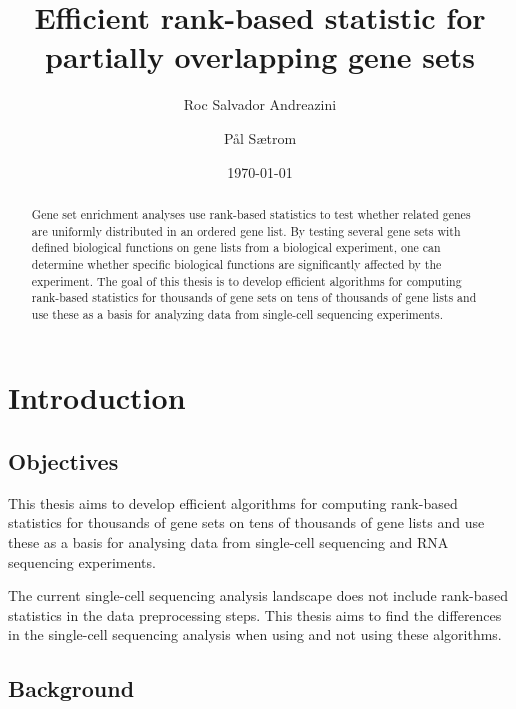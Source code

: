 \documentclass[aps,prb,twocolumn,superscriptaddress,floatfix,longbibliography]{revtex4-2}
\newcommand{\mytitle}{Efficient rank-based statistic for partially overlapping gene sets}
\begin{document}
\title{\mytitle}

\author{Roc Salvador Andreazini}
\author{Pål Sætrom}


\date{\today}

\begin{abstract}
Gene set enrichment analyses use rank-based statistics to test whether related genes are uniformly distributed in an ordered gene list. By testing several gene sets with defined biological functions on gene lists from a biological experiment, one can determine whether specific biological functions are significantly affected by the experiment. The goal of this thesis is to develop efficient algorithms for computing rank-based statistics for thousands of gene sets on tens of thousands of gene lists and use these as a basis for analyzing data from single-cell sequencing experiments.
\end{abstract}

\maketitle
\section{\label{sec:Start}Introduction}

\subsection{Objectives} This thesis aims to develop efficient algorithms for computing rank-based statistics for thousands of gene sets on tens of thousands of gene lists and use these as a basis for analysing data from single-cell sequencing and RNA sequencing experiments.

The current single-cell sequencing analysis landscape does not include rank-based statistics in the data preprocessing steps. This thesis aims to find the differences in the single-cell sequencing analysis when using and not using these algorithms.

\subsection{Background}
\end{document}
